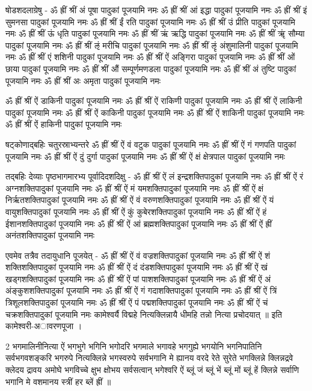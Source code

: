 षोडशदलाग्रेषु -
ॐ ह्रीं श्रीं अं पूषा पादुकां पूजयामि नमः
ॐ ह्रीं श्रीं आं इद्धा पादुकां पूजयामि नमः
ॐ ह्रीं श्रीं इं सुमनसा पादुकां पूजयामि नमः
ॐ ह्रीं श्रीं ईं रति पादुकां पूजयामि नमः
ॐ ह्रीं श्रीं उं प्रीति पादुकां पूजयामि नमः
ॐ ह्रीं श्रीं ऊं धृति पादुकां पूजयामि नमः
ॐ ह्रीं श्रीं ऋं ऋद्धि पादुकां पूजयामि नमः
ॐ ह्रीं श्रीं ॠं सौम्या पादुकां पूजयामि नमः
ॐ ह्रीं श्रीं ऌं मरीचि पादुकां पूजयामि नमः
ॐ ह्रीं श्रीं ऌृं अंशुमालिनी पादुकां पूजयामि नमः
ॐ ह्रीं श्रीं एं शशिनी पादुकां पूजयामि नमः
ॐ ह्रीं श्रीं ऐं अङ्गिरा पादुकां पूजयामि नमः
ॐ ह्रीं श्रीं ओं छाया पादुकां पूजयामि नमः
ॐ ह्रीं श्रीं औं सम्पूर्णमणडला पादुकां पूजयामि नमः
ॐ ह्रीं श्रीं अं तुष्टि पादुकां पूजयामि नमः
ॐ ह्रीं श्रीं अः अमृता पादुकां पूजयामि नमः

ॐ ह्रीं श्रीं ऐं डाकिनी पादुकां पूजयामि नमः
ॐ ह्रीं श्रीं ऐं राकिणी पादुकां पूजयामि नमः
ॐ ह्रीं श्रीं ऐं लाकिनी पादुकां पूजयामि नमः
ॐ ह्रीं श्रीं ऐं काकिनी पादुकां पूजयामि नमः
ॐ ह्रीं श्रीं ऐं शाकिनी पादुकां पूजयामि नमः
ॐ ह्रीं श्रीं ऐं हाकिनी पादुकां पूजयामि नमः

षट्कोणाद्बहिः चतुरस्राभ्यन्तरे 
ॐ ह्रीं श्रीं ऐं वं वटुक पादुकां पूजयामि नमः
ॐ ह्रीं श्रीं ऐं गं गणपति पादुकां पूजयामि नमः
ॐ ह्रीं श्रीं ऐं दुं दुर्गा पादुकां पूजयामि नमः
ॐ ह्रीं श्रीं ऐं क्षं क्षेत्रपाल पादुकां पूजयामि नमः

तद्बहिः देव्याः पृष्ठभागमारभ्य पूर्वादिदशदिक्षु -
ॐ ह्रीं श्रीं ऐं लं इन्द्रशक्तिपादुकां पूजयामि नमः
ॐ ह्रीं श्रीं ऐं रं अग्नशक्तिपादुकां पूजयामि नमः
ॐ ह्रीं श्रीं ऐं मं यमशक्तिपादुकां पूजयामि नमः
ॐ ह्रीं श्रीं ऐं क्षं निर्ऋतशक्तिपादुकां पूजयामि नमः
ॐ ह्रीं श्रीं ऐं वं वरुणशक्तिपादुकां पूजयामि नमः
ॐ ह्रीं श्रीं ऐं यं वायुशक्तिपादुकां पूजयामि नमः
ॐ ह्रीं श्रीं ऐं कुं कुबेरशक्तिपादुकां पूजयामि नमः
ॐ ह्रीं श्रीं ऐं हं ईशानशक्तिपादुकां पूजयामि नमः
ॐ ह्रीं श्रीं ऐं आं ब्रह्मशक्तिपादुकां पूजयामि नमः
ॐ ह्रीं श्रीं ऐं ह्रीं अनंतशक्तिपादुकां पूजयामि नमः

एवमेव तत्रैव तदायुधानि पूजयेत् -
ॐ ह्रीं श्रीं ऐं वं वज्रशक्तिपादुकां पूजयामि नमः
ॐ ह्रीं श्रीं ऐं शं शक्तिशक्तिपादुकां पूजयामि नमः
ॐ ह्रीं श्रीं ऐं दं दंडशक्तिपादुकां पूजयामि नमः
ॐ ह्रीं श्रीं ऐं खं खड्गशक्तिपादुकां पूजयामि नमः
ॐ ह्रीं श्रीं ऐं पां पाशशक्तिपादुकां पूजयामि नमः
ॐ ह्रीं श्रीं ऐं अं अंङ्कुशशक्तिपादुकां पूजयामि नमः
ॐ ह्रीं श्रीं ऐं गं गदाशक्तिपादुकां पूजयामि नमः
ॐ ह्रीं श्रीं ऐं त्रिं त्रिशूलशक्तिपादुकां पूजयामि नमः
ॐ ह्रीं श्रीं ऐं पं पद्मशक्तिपादुकां पूजयामि नमः
ॐ ह्रीं श्रीं ऐं चं चक्रशक्तिपादुकां पूजयामि नमः
कामेश्वर्यै विद्महे नित्यक्लिन्नायै धीमहि तन्नो नित्या प्रचोदयात् ॥
इति कामेश्वरी-अावरणपूजा ।


2 भगमालिनीनित्या 
ऐं भगभुगे भगिनि भगोदरि भगमाले भगावहे भगगुह्ये भगयोनि भगनिपातिनि सर्वभगवशङ्करि भगरुपे नित्यक्लिन्ने भगस्वरुपे सर्वभगानि मे ह्यानय वरदे रेते सुरेते भगक्लिन्ने क्लिन्नद्रवे क्लेदय द्रावय अमोघे भगविच्चे क्षुभ क्षोभय सर्वसत्वान् भगेश्वरि ऐं ब्लूं जं ब्लूं भें ब्लूं मों ब्लूं हें क्लिन्ने सर्वाणि भगानि मे वशमानय स्त्रीं हर ब्लें ह्रीं ॥

